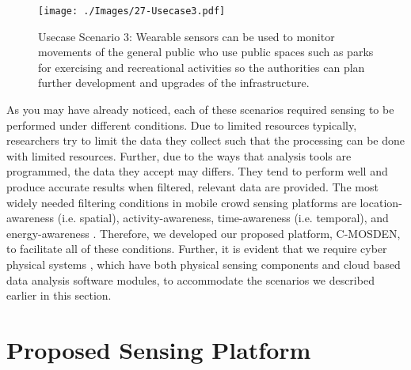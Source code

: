 \documentclass[journal]{IEEEtran}
\begin{document}
\begin{figure}[h]
 \centering
\texttt{[image: ./Images/27-Usecase3.pdf]}
\caption{Usecase Scenario 3: Wearable sensors can be used to monitor movements of the  general public who use public spaces such as parks for exercising and recreational activities so the authorities can plan further development and upgrades of the infrastructure.}
 \label{Figure:Usecase3}	
\end{figure}



As you may have already noticed, each of these scenarios required sensing to be performed under different conditions. Due to limited resources typically, researchers try to limit the data they collect such that the processing can be done with limited resources. Further, due to the ways that analysis tools are programmed, the data they accept may differs. They tend to perform well and produce accurate results when filtered, relevant data are provided. The most widely needed filtering conditions in mobile crowd sensing platforms are location-awareness (i.e. spatial),  activity-awareness, time-awareness (i.e. temporal), and energy-awareness \cite{SeCoMan}. Therefore, we developed our proposed platform, C-MOSDEN, to facilitate all of these conditions. Further, it is evident that we require cyber physical systems \cite{Khaitan}, which have both physical sensing components and cloud based data analysis software modules, to accommodate the scenarios we described earlier in this section.



















\section{Proposed Sensing Platform}
\label{sec:Solution}
\end{document}
